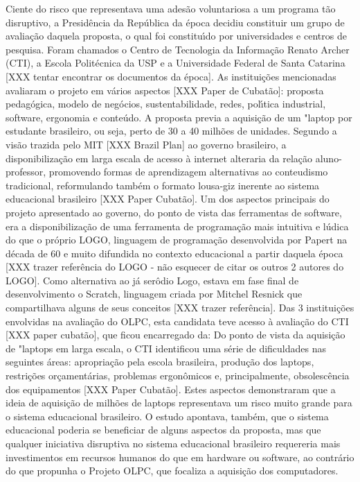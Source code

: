 \documentclass[
12pt,		%
openright,	%
twoside,  %
a4paper,			%
chapter=TITLE,		%
english,			%
french,				%
spanish,			%
brazil				%
]{USPSC-classe/USPSC}
\begin{document}
Ciente do risco que representava uma ades\~ao voluntariosa a um programa t\~ao disruptivo, a Presid\^encia da Rep\'ublica da \'epoca decidiu constituir um grupo de avalia\c{c}\~ao  daquela proposta, o  qual foi constitu\'{\i}do por universidades e centros de pesquisa. Foram chamados o Centro de Tecnologia da Informa\c{c}\~ao Renato Archer (CTI), a Escola Polit\'ecnica da USP e a Universidade Federal de Santa Catarina [XXX tentar encontrar os documentos da \'epoca]. 
As institui\c{c}\~oes mencionadas avaliaram o projeto em v\'arios aspectos [XXX Paper de Cubat\~ao]: proposta pedag\'ogica, modelo de neg\'ocios, sustentabilidade, redes, pol\'{\i}tica industrial, software, ergonomia e conte\'udo. A proposta previa a aquisi\c{c}\~ao de um "laptop por estudante brasileiro, ou seja, perto de 30 a 40 milh\~oes de unidades.
Segundo a vis\~ao trazida pelo MIT [XXX Brazil Plan] ao governo brasileiro, a disponibiliza\c{c}\~ao em larga escala de acesso \`a internet alteraria da rela\c{c}\~ao aluno-professor, promovendo formas de aprendizagem alternativas ao conteudismo tradicional, reformulando tamb\'em o formato lousa-giz inerente ao sistema educacional brasileiro [XXX Paper Cubat\~ao].
Um dos aspectos principais do projeto apresentado ao governo, do ponto de vista das ferramentas de software, era a disponibiliza\c{c}\~ao de uma ferramenta de programa\c{c}\~ao mais intuitiva e l\'udica do que o pr\'oprio LOGO, linguagem de programa\c{c}\~ao desenvolvida por Papert na d\'ecada de 60 e muito difundida no contexto educacional a partir daquela \'epoca [XXX trazer refer\^encia do LOGO - n\~ao esquecer de citar os outros 2 autores do LOGO]. Como alternativa ao j\'a ser\^odio Logo, estava em fase final de desenvolvimento o Scratch, linguagem criada por Mitchel Resnick que compartilhava alguns de seus conceitos [XXX trazer refer\^encia].
Das 3 institui\c{c}\~oes envolvidas na avalia\c{c}\~ao do OLPC, esta candidata  teve acesso \`a avalia\c{c}\~ao do CTI [XXX paper cubat\~ao], que ficou encarregado da:
Do ponto de vista da aquisi\c{c}\~ao de "laptops em larga escala, o CTI identificou uma s\'erie de dificuldades nas seguintes \'areas: apropria\c{c}\~ao pela escola brasileira, produ\c{c}\~ao dos laptops, restri\c{c}\~oes or\c{c}ament\'arias, problemas ergon\^omicos e, principalmente, obsolesc\^encia dos equipamentos [XXX Paper Cubat\~ao]. Estes aspectos demonstraram que a ideia de aquisi\c{c}\~ao de milh\~oes de laptops representava um risco muito grande para o sistema educacional brasileiro.
O estudo apontava, tamb\'em, que o sistema educacional poderia se beneficiar de alguns aspectos da proposta, mas que qualquer iniciativa disruptiva no sistema educacional brasileiro requereria mais investimentos em recursos humanos do que em hardware ou software, ao contr\'ario do que propunha o Projeto OLPC, que focaliza a aquisi\c{c}\~ao dos computadores. 
\end{document}
